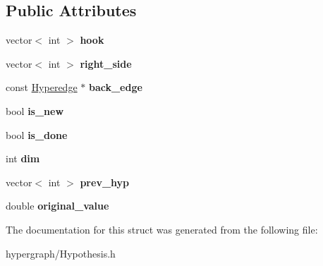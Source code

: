 \subsection*{Public Attributes}
\begin{DoxyCompactItemize}
\item 
\hypertarget{structHypothesis_ac655db78b0537edd6a746d34b4f72b71}{
vector$<$ int $>$ {\bfseries hook}}
\label{structHypothesis_ac655db78b0537edd6a746d34b4f72b71}

\item 
\hypertarget{structHypothesis_a7eb560f6d9417167ecc22161dd787d4f}{
vector$<$ int $>$ {\bfseries right\_\-side}}
\label{structHypothesis_a7eb560f6d9417167ecc22161dd787d4f}

\item 
\hypertarget{structHypothesis_af5fbe86aeeebbfd8c0e9ae14ffb88018}{
const \hyperlink{classScarab_1_1Hyperedge}{Hyperedge} $\ast$ {\bfseries back\_\-edge}}
\label{structHypothesis_af5fbe86aeeebbfd8c0e9ae14ffb88018}

\item 
\hypertarget{structHypothesis_ae57d8dcd62f579e1a8657dfd77bf729a}{
bool {\bfseries is\_\-new}}
\label{structHypothesis_ae57d8dcd62f579e1a8657dfd77bf729a}

\item 
\hypertarget{structHypothesis_a6e3c295516e153250c5d4f3f82359320}{
bool {\bfseries is\_\-done}}
\label{structHypothesis_a6e3c295516e153250c5d4f3f82359320}

\item 
\hypertarget{structHypothesis_a21da5a61ebfd89d8d035a1db23b4e3fb}{
int {\bfseries dim}}
\label{structHypothesis_a21da5a61ebfd89d8d035a1db23b4e3fb}

\item 
\hypertarget{structHypothesis_a94d5ebba76057febd5ca222adc6389da}{
vector$<$ int $>$ {\bfseries prev\_\-hyp}}
\label{structHypothesis_a94d5ebba76057febd5ca222adc6389da}

\item 
\hypertarget{structHypothesis_a70eeecc496ad9b9049b5b53dd1587c98}{
double {\bfseries original\_\-value}}
\label{structHypothesis_a70eeecc496ad9b9049b5b53dd1587c98}

\end{DoxyCompactItemize}


The documentation for this struct was generated from the following file:\begin{DoxyCompactItemize}
\item 
hypergraph/Hypothesis.h\end{DoxyCompactItemize}
